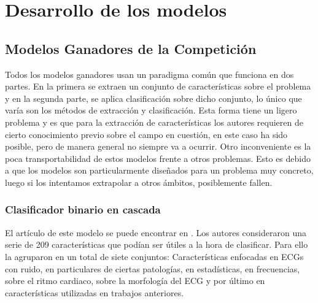 



\chapter{Desarrollo de los modelos}\label{ch:desarrollo}

\section{Modelos Ganadores de la Competición}
        

        Todos los modelos ganadores usan un paradigma común que funciona en dos partes. En la primera se extraen un conjunto de características sobre el problema y en la segunda parte, se aplica clasificación sobre dicho conjunto, lo único que varía son los métodos de extracción y clasificación. Esta forma tiene un ligero problema y es que para la extracción de características los autores requieren de cierto conocimiento previo sobre el campo en cuestión, en este caso ha sido posible, pero de manera general no siempre va a ocurrir. Otro inconveniente es la poca transportabilidad de estos modelos frente a otros problemas. Esto es debido a que los modelos son particularmente diseñados para un problema muy concreto, luego si los intentamos extrapolar a otros ámbitos, posiblemente fallen. 
        
    \subsection{Clasificador binario en cascada}
       
             El artículo de este modelo se puede encontrar en \cite{datta2017identifying}. Los autores consideraron una serie de 209 características que podían ser útiles a la hora de clasificar. Para ello la agruparon en un total de siete conjuntos: Características enfocadas en ECGs con ruido, en particulares de ciertas patologías, en estadísticas, en frecuencias, sobre el ritmo cardiaco, sobre la morfología del ECG y por último en características utilizadas en trabajos anteriores. \\
             
